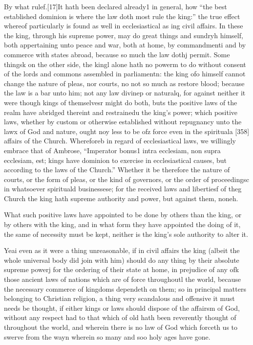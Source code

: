 By what rulef.[17]It hath been declared already1 in general, how “the best established dominion is where the law doth most rule the king:” the true effect whereof particularly is found as well in ecclesiastical as ing civil affairs. In these the king, through his supreme power, may do great things and sundryh himself, both appertaining unto peace and war, both at home, by commandmenti and by commerce with states abroad, because so much the law dothj permit. Some thingsk on the other side, the kingl alone hath no powerm to do without consent of the lords and commons assembled in parliamentn: the king ofo himself cannot change the nature of pleas, nor courts, no not so much as restore blood; because the law is a bar unto him; not any law divinep or naturalq, for against neither it were though kings of themselvesr might do both, buts the positive laws of the realm have abridged thereint and restrainedu the king’s power; which positive laws, whether by custom or otherwise established without repugnancy unto the lawx of God and nature, ought noy less to be ofz force even in the spirituala [358] affairs of the Church. Whereforeb in regard of ecclesiastical laws, we willingly embrace that of Ambrose, “Imperator bonus1 intra ecclesiam, non supra ecclesiam, est; kings have dominion to exercise in ecclesiastical causes, but according to the laws of the Church.” Whether it be therefore the nature of courts, or the form of pleas, or the kind of governors, or the order of proceedingsc in whatsoever spirituald businessese; for the received laws and libertiesf of theg Church the king hath supreme authority and power, but against them, noneh.

What such positive laws have appointed to be done by others than the king, or by others with the king, and in what form they have appointed the doing of it, the same of necessity must be kept, neither is the king’s sole authority to alter it.

Yeai even as it were a thing unreasonable, if in civil affairs the king (albeit the whole universal body did join with him) should do any thing by their absolute supreme powerj for the ordering of their state at home, in prejudice of any ofk those ancient laws of nations which are of force throughoutl the world, because the necessary commerce of kingdoms dependeth on them; so in principal matters belonging to Christian religion, a thing very scandalous and offensive it must needs be thought, if either kings or laws should dispose of the affairsm of God, without any respect had to that which of old hath been reverently thought of throughout the world, and wherein there is no law of God which forceth us to swerve from the wayn wherein so many and soo holy ages have gone.

